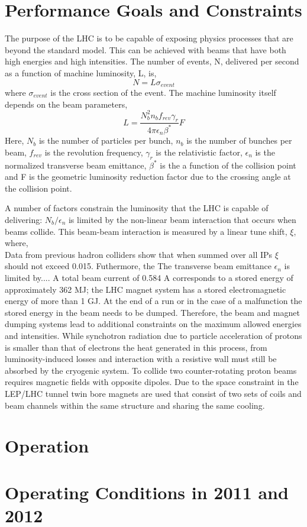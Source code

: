 \section{Performance Goals and Constraints}
The purpose of the LHC is to be
capable of exposing physics processes that are beyond the standard
model. This can be achieved with beams %
that have both high energies and high intensities.
The number of events, N, delivered per second as a function
of machine luminosity, L, is,
\begin{equation}
N=L\sigma_{event}
\end{equation}
where $\sigma_{event}$ is the cross section of the event.
The machine luminosity itself depends on the beam parameters,
\begin{equation}
L=\frac{N_{b}^{2}n_{b}f_{rev}\gamma_{r}}{4\pi \epsilon_{n}\beta^{*}}F
\end{equation}
Here, $N_{b}$ is the number of particles per bunch, $n_{b}$
is the number of bunches per beam, $f_{rev}$ is the
revolution frequency, $\gamma_{r}$ is the relativistic factor, 
$\epsilon_{n}$ is the normalized transverse beam
emittance, $\beta^{*}$ is the a function of the collision point
and F is the geometric luminosity reduction factor due to the crossing
angle at the collision point. 

A number of factors constrain the luminosity that the LHC is capable
of delivering: $N_{b}/\epsilon_{n}$ is limited by the%
non-linear beam interaction that occurs when beams collide. This
beam-beam interaction is measured by a linear tune shift, $\xi$, where,
\begin{equation}
\end{equation}
Data from previous hadron colliders show that when summed over
all IPs $\xi$ should not exceed 0.015. %
Futhermore, the %
The transverse beam emittance $\epsilon_{n}$ is limited by.... 
A total beam current of 0.584 A corresponds to a stored energy
of approximately 362 MJ; the LHC magnet system has a stored
electromagnetic energy of more than 1 GJ.
At the end of a run or in the case of a malfunction the stored
energy in the beam needs to be dumped. Therefore, the beam
and magnet dumping systems lead to additional constraints
on the maximum allowed energies and intensities.
While synchotron radiation due to particle acceleration of protons%
is smaller than that of electrons the heat generated in this process,
 from luminosity-induced losses and interaction with a resistive wall
must still be absorbed by the cryogenic system. 
To collide two counter-rotating proton beams requires magnetic fields
with opposite dipoles. Due to the space constraint in the LEP/LHC
tunnel twin bore magnets are used that consist of two sets of 
coils and beam channels within the same structure and
sharing the same cooling. 

\section{Operation}

\section{Operating Conditions in 2011 and 2012}

